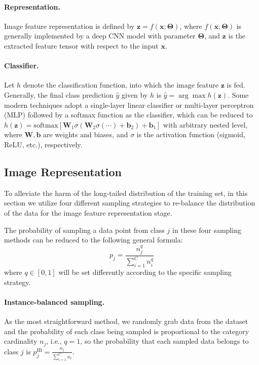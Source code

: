 \documentclass{article}
\newcommand{\argmax}{\arg\max}
\begin{document}
\paragraph{Representation.} Image feature representation is defined by $\mathbf{z}=f(\mathbf{x};\bm{\Theta})$, where $f(\mathbf{x};\bm{\Theta})$ is generally implemented by a deep CNN model with parameter $\bm{\Theta}$, and $\mathbf{z}$ is the extracted feature tensor with respect to the input $\mathbf{x}$.

\paragraph{Classifier.} Let $h$ denote the classification function, into which the image feature $\mathbf{z}$ is fed. Generally, the final class prediction $\hat{y}$ given by $h$ is $\hat{y}=\argmax h(\mathbf
{z})$. Some modern techniques adopt a single-layer linear classifier or multi-layer perceptron (MLP) followed by a softmax function as the classifier, which can be reduced to $h(\mathbf{z})=\mathrm{softmax}\left[\mathbf{W}_1\sigma(\mathbf{W}_2\sigma(\cdots)+\mathbf{b}_2)+\mathbf{b}_1\right]$ with arbitrary nested level, where $\mathbf{W},\mathbf{b}$ are weights and biases, and $\sigma$ is the activation function (sigmoid, ReLU, etc.), respectively.

\subsection{Image Representation}


To alleviate the harm of the long-tailed distribution of the training set, in this section we utilize four different sampling strategies to re-balance the distribution of the data for the image feature representation stage.

The probability of sampling a data point from class $j$ in these four sampling methods can be reduced to the following general formula:
\begin{equation}
    p_j=\frac{n_j^{q}}{\sum_{i=1}^{C}n_i^{q}}
\end{equation}
where $q\in[0,1]$ will be set differently according to the specific sampling strategy.

\paragraph{Instance-balanced sampling.}As the most straightforward method, we randomly grab data from the dataset and the probability of each class being sampled is proportional to the category cardinality $n_j$, i.e., $q=1$, so the probability that each sampled data belongs to class $j$ is $p_j^{\mathrm{IB}}=\frac{n_j}{\sum_{i=1}^{C}n_i}$.
\end{document}
